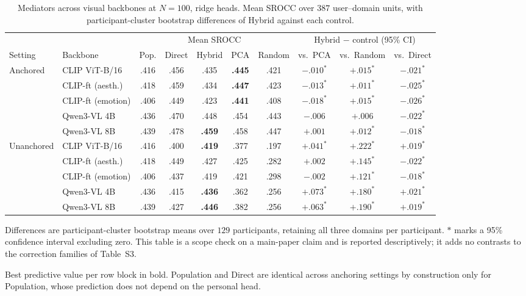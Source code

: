\begin{table}[t]
\centering
\begin{threeparttable}
\caption{Mediators across visual backbones at $N=100$, ridge heads. Mean SROCC
over $387$ user--domain units, with participant-cluster bootstrap differences
of Hybrid against each control.}
\label{tab:mediator_backbone}
\footnotesize
\setlength{\tabcolsep}{4pt}
\begin{tabular}{llccccc ccc}
\toprule
& & \multicolumn{5}{c}{Mean SROCC} & \multicolumn{3}{c}{Hybrid $-$ control (95\% CI)} \\
\cmidrule(lr){3-7}\cmidrule(lr){8-10}
Setting & Backbone & Pop. & Direct & Hybrid & PCA & Random & vs.\ PCA & vs.\ Random & vs.\ Direct \\
\midrule
\multirow{5}{*}{Anchored}
 & CLIP ViT-B/16      & .416 & .456 & .435 & \textbf{.445} & .421 & $-.010^{\ast}$ & $+.015^{\ast}$ & $-.021^{\ast}$ \\
 & CLIP-ft (aesth.)   & .418 & .459 & .434 & \textbf{.447} & .423 & $-.013^{\ast}$ & $+.011^{\ast}$ & $-.025^{\ast}$ \\
 & CLIP-ft (emotion)  & .406 & .449 & .423 & \textbf{.441} & .408 & $-.018^{\ast}$ & $+.015^{\ast}$ & $-.026^{\ast}$ \\
 & Qwen3-VL 4B        & .436 & .470 & .448 & .454 & .443 & $-.006$ & $+.006$ & $-.022^{\ast}$ \\
 & Qwen3-VL 8B        & .439 & .478 & \textbf{.459} & .458 & .447 & $+.001$ & $+.012^{\ast}$ & $-.018^{\ast}$ \\
\midrule
\multirow{5}{*}{Unanchored}
 & CLIP ViT-B/16      & .416 & .400 & \textbf{.419} & .377 & .197 & $+.041^{\ast}$ & $+.222^{\ast}$ & $+.019^{\ast}$ \\
 & CLIP-ft (aesth.)   & .418 & .449 & .427 & .425 & .282 & $+.002$ & $+.145^{\ast}$ & $-.022^{\ast}$ \\
 & CLIP-ft (emotion)  & .406 & .437 & .419 & .421 & .298 & $-.002$ & $+.121^{\ast}$ & $-.018^{\ast}$ \\
 & Qwen3-VL 4B        & .436 & .415 & \textbf{.436} & .362 & .256 & $+.073^{\ast}$ & $+.180^{\ast}$ & $+.021^{\ast}$ \\
 & Qwen3-VL 8B        & .439 & .427 & \textbf{.446} & .382 & .256 & $+.063^{\ast}$ & $+.190^{\ast}$ & $+.019^{\ast}$ \\
\bottomrule
\end{tabular}
\begin{tablenotes}[flushleft]\footnotesize
\item Differences are participant-cluster bootstrap means over $129$
participants, retaining all three domains per participant. $\ast$ marks a
95\% confidence interval excluding zero. This table is a scope check on a
main-paper claim and is reported descriptively; it adds no contrasts to the
correction families of Table~S3.
\item Best predictive value per row block in bold. Population and Direct are
identical across anchoring settings by construction only for Population, whose
prediction does not depend on the personal head.
\end{tablenotes}
\end{threeparttable}
\end{table}

